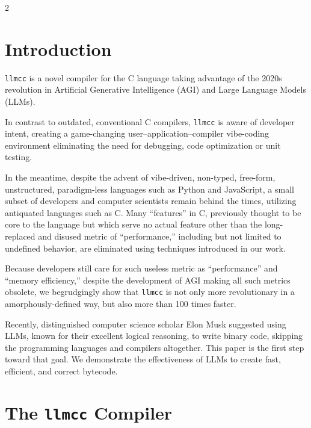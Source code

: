 \documentclass{article}
\newcommand{\llmcc}{\texttt{llmcc}}
\begin{document}
\setlength{\columnsep}{12pt}
\begin{multicols}{2}
\raggedcolumns

\section{Introduction}

\llmcc{} is a novel compiler for the C language taking advantage of the 2020s revolution in Artificial Generative Intelligence (AGI) and Large Language Models (LLMs).

In contrast to outdated, conventional C compilers, \llmcc{} is aware of developer intent, creating a game-changing user--application--compiler vibe-coding environment eliminating the need for debugging, code optimization or unit testing. 

In the meantime, despite the advent of vibe-driven, non-typed, free-form, unstructured, paradigm-less languages such as Python and JavaScript, a small subset of developers and computer scientists remain behind the times, utilizing antiquated languages such as C. Many ``features'' in C, previously thought to be core to the language but which serve no actual feature other than the long-replaced and disused metric of ``performance,'' including but not limited to undefined behavior, are eliminated using techniques introduced in our work.

Because developers still care for such useless metric as ``performance'' and ``memory efficiency,'' despite the development of AGI making all such metrics obsolete, we begrudgingly show that \llmcc{} is not only more revolutionary in a amorphously-defined way, but also more than 100 times faster.

Recently, distinguished computer science scholar Elon Musk suggested using LLMs, known for their excellent logical reasoning, to write binary code, skipping the programming languages and compilers altogether. This paper is the first step toward that goal. We demonstrate the effectiveness of LLMs to create fast, efficient, and correct bytecode.

\section{The \llmcc{} Compiler}

\begin{center}
\end{center}
\end{multicols}
\end{document}
